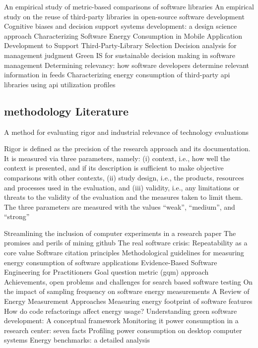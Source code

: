 \citep{delaMora2018} An empirical study of metric-based comparisons of software libraries
\citep{Zaimi2015} An empirical study on the reuse of third-party libraries in open-source software development
\citep{Arnott2006} Cognitive biases and decision support systems development: a design science approach
\citep{Langner2023} Characterizing Software Energy Consumption in Mobile Application Development to Support Third-Party-Library Selection
\citep{Goodwin2004} Decision analysis for management judgment
\citep{Anthony2016} Green IS for sustainable decision making in software management
\citep{Fritz2011} Determining relevancy: how software developers determine relevant information in feeds
\citep{Schuler2020} Characterizing energy consumption of third-party api libraries using api utilization profiles

\subsection{methodology Literature}

\citep{Ivarsson2011} A method for evaluating rigor and industrial relevance of technology evaluations

Rigor is defined as the precision of the research approach and its documentation. It is measured via three parameters, namely: (i) context, i.e., how well the context is presented, and if its description is sufficient to make objective comparisons with other contexts, (ii) study design, i.e., the products, resources and processes used in the evaluation, and (iii) validity, i.e., any limitations or threats to the validity of the evaluation and the measures taken to limit them. The three parameters are measured with the values “weak”, “medium”, and “strong”

\citep{Halle2018} Streamlining the inclusion of computer experiments in a research paper
\citep{Kalliamvakou2014} The promises and perils of mining github
\citep{Krishnamurthi2015} The real software crisis: Repeatability as a core value
\citep{Smith2016} Software citation principles
\citep{Ardito2019} Methodological guidelines for measuring energy consumption of software applications
\citep{Dyba2005} Evidence-Based Software Engineering for Practitioners
\citep{VanSolingen2002} Goal question metric (gqm) approach
\citep{Harman2015} Achievements, open problems and challenges for search based software testing
\citep{Saborido2015} On the impact of sampling frequency on software energy measurements
\citep{Noureddine2013} A Review of Energy Measurement Approaches
\citep{Islam2016} Measuring energy footprint of software features
\citep{Sahin2014} How do code refactorings affect energy usage?
\citep{Ardito2015} Understanding green software development: A conceptual framework
\citep{Vetro2011} Monitoring it power consumption in a research center: seven facts
\citep{Procaccianti2011} Profiling power consumption on desktop computer systems
\citep{Poess2010} Energy benchmarks: a detailed analysis


